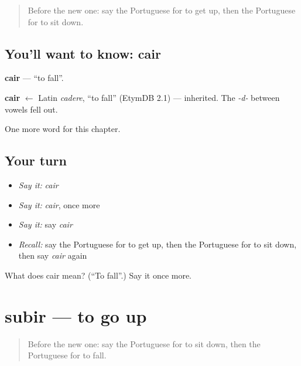 \label{lesson:PT-C132-cair}



\begin{quote}
Before the new one: say the Portuguese for to get up, then the Portuguese for to sit down.
\end{quote}

\subsection*{You'll want to know: cair}
\textbf{cair} — \textquotedblleft{}to fall\textquotedblright{}.

\begin{cousinweb}
\textbf{cair} $\leftarrow$ Latin \emph{cadere}, \textquotedblleft{}to fall\textquotedblright{} (EtymDB 2.1) — inherited. The \emph{-d-} between vowels fell out.
\end{cousinweb}

\begin{grammarlens}[title={What you've built}]
One more word for this chapter.
\end{grammarlens}

\subsection*{Your turn}
\begin{itemize}
\raggedright
  \item \emph{Say it:} \emph{cair}
  \item \emph{Say it:} \emph{cair}, once more
  \item \emph{Say it:} say \emph{cair}
  \item \emph{Recall:} say the Portuguese for to get up, then the Portuguese for to sit down, then say \emph{cair} again
\end{itemize}

\begin{tcolorbox}[breakable,colback=teal!4,colframe=teal!35!black,title={Before you move on}]
What does cair mean? (\textquotedblleft{}To fall\textquotedblright{}.) Say it once more.
\end{tcolorbox}
\section[subir]{subir — to go up}

\label{lesson:PT-C132-subir}



\begin{quote}
Before the new one: say the Portuguese for to sit down, then the Portuguese for to fall.
\end{quote}

